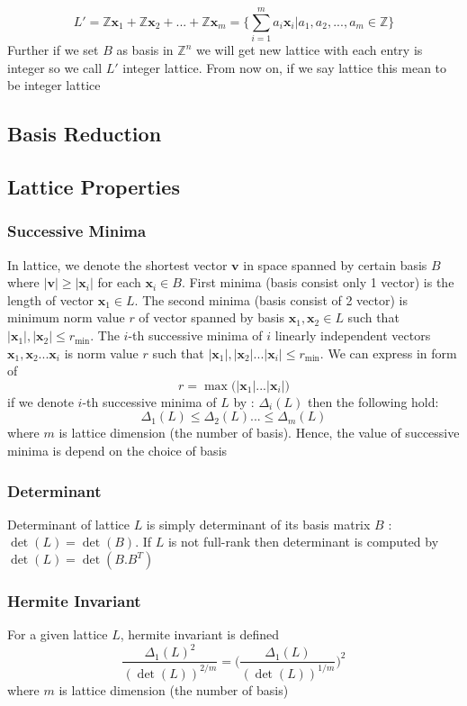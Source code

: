 \[ L' = \mathbb{Z}\mathbf{x}_1 + \mathbb{Z}\mathbf{x}_2 +...+ \mathbb{Z}\mathbf{x}_m = \Big \{ \sum_{i=1}^{m} a_{i}\mathbf{x}_{i} | a_{1}, a_{2},...,a_{m} \in \mathbb{Z} \Big \} \]
Further if we set $B$ as basis in $ \mathbb{Z}^n $ we will get new lattice with each entry is integer so we call $L'$ integer lattice. From now on, if we say lattice this mean to be integer lattice
\subsection{Basis Reduction}
\subsection{Lattice Properties}
\subsubsection{Successive Minima}
In lattice, we denote the shortest vector $\mathbf{v}$ in space spanned by certain basis $B$ where $|\mathbf{v}| \geq |\mathbf{x}_i|$ for each $\mathbf{x}_i \in B$. First minima (basis consist only 1 vector) is the length of vector $\mathbf{x}_{1} \in L$. The second minima (basis consist of 2 vector) is minimum norm value $r$ of vector spanned by basis $\mathbf{x}_{1}, \mathbf{x}_{2} \in L$ such that $|\mathbf{x}_{1}|, |\mathbf{x}_{2}| \leq r_{\min}$. The $i$-th successive minima of $i$ linearly independent vectors $\mathbf{x}_{1}, \mathbf{x}_{2} ... \mathbf{x}_{i}$ is norm value $r$ such that $|\mathbf{x}_{1}|, |\mathbf{x}_{2}| ... |\mathbf{x}_{i}| \leq r_{\min}$. We can express in form of
\[ r = \max \Big ( |\mathbf{x}_{1}|... |\mathbf{x}_{i}|\Big ) \]
if we denote $i$-th successive minima of $L$ by : $\Delta_{i}(L)$ then the following hold:
\[ \Delta_{1}(L) \leq \Delta_{2}(L) ...\leq \Delta_{m}(L) \]
where $m$ is lattice dimension (the number of basis). Hence, the value of successive minima is depend on the choice of basis
\subsubsection{Determinant}
Determinant of lattice $L$ is simply determinant of its basis matrix $B$ : $\det(L)=\det(B)$. If $L$ is not full-rank then determinant is computed by $\det(L)=\det(B.B^{T})$
\subsubsection{Hermite Invariant}
For a given lattice $L$, hermite invariant is defined
\[ \frac{\Delta_{1}(L)^{2}}{(\det(L))^{2/m}} = \Big ( \frac{\Delta_{1}(L)}{(\det(L))^{1/m}} \Big )^{2} \]
where $m$ is lattice dimension (the number of basis)
